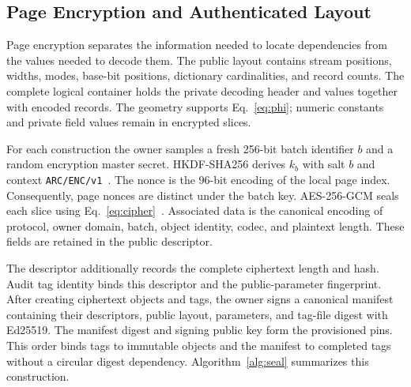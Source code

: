 \documentclass[10pt,journal]{IEEEtran}
\begin{document}
\subsection{Page Encryption and Authenticated Layout}\label{sec:seal}
Page encryption separates the information needed to locate dependencies
from the values needed to decode them. The public layout contains stream positions, widths, modes, base-bit
positions, dictionary cardinalities, and record counts. The complete logical
container holds the private decoding header and values together with encoded
records. The geometry supports Eq.~\eqref{eq:phi}; numeric constants and
private field values remain in encrypted slices.

For each construction the owner samples a fresh 256-bit batch identifier
$b$ and a random encryption master secret. HKDF-SHA256 derives $k_b$ with
salt $b$ and context \texttt{ARC/ENC/v1}~\cite{RFC5869}.
The nonce is the 96-bit encoding of the local page index. Consequently,
page nonces are distinct under the batch key. AES-256-GCM seals each slice
using Eq.~\eqref{eq:cipher}~\cite{RFC5116}. Associated data is the canonical
encoding of protocol, owner domain, batch, object identity, codec, and
plaintext length. These fields are retained in the public descriptor.

The descriptor additionally records the complete ciphertext length and
hash. Audit tag identity binds this descriptor and the public-parameter
fingerprint. After creating ciphertext objects and tags, the owner signs a
canonical manifest containing their descriptors, public layout, parameters,
and tag-file digest with Ed25519. The manifest digest and signing public
key form the provisioned pins. This order binds tags to immutable objects
and the manifest to completed tags without a circular digest dependency.
Algorithm~\ref{alg:seal} summarizes this construction.
\end{document}

